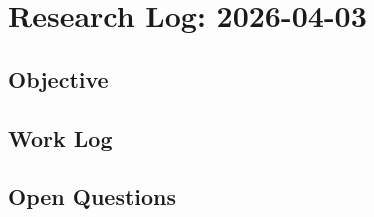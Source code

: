 
\section*{Research Log: 2026-04-03}

\subsection*{Objective}


\subsection*{Work Log}


\subsection*{Open Questions}

